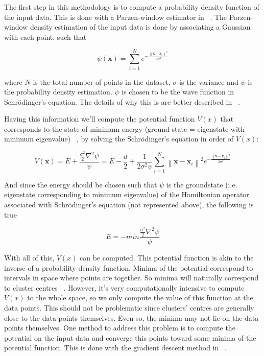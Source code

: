 The first step in this methodology is to compute a probability density function of the input data. This is done with a Parzen-window estimator in ~\cite{Horn2001a,Weinstein2009}.
The Parzen-window density estimation of the input data is done by associating a Gaussian with each point, such that

$$ \psi (\mathbf{x}) = \sum ^N _{i=1} e^{- \frac{\left \| \mathbf{x}-\mathbf{x}_i \right \| ^2}{2 \sigma ^2}} $$

where $N$ is the total number of points in the dataset, $\sigma$ is the variance and $\psi$ is the probability density estimation. $\psi$ is chosen to be the wave function in Schrödinger's equation. The details of why this is are better described in ~\cite{Weinstein2009,Horn2001a,Horn2001b}.

Having this information we'll compute the potential function $V(x)$ that corresponds to the state of minimum energy (ground state = eigenstate with minimum eigenvalue) ~\cite{Horn2001a}, by solving the Schrödinger's equation in order of $V(x)$:      

$$
V(\mathbf{x}) = E + \frac {\frac{\sigma^2}{2}\nabla^2 \psi }{\psi} 
= E - \frac{d}{2} + \frac {1}{2 \sigma^2 \psi} \sum ^N _{i=1} \left \| \mathbf{x}-\mathbf{x}_i \right \| ^2 e^{- \frac{\left \| \mathbf{x}-\mathbf{x}_i \right \| ^2}{2 \sigma ^2}}
$$

And since the energy should be chosen such that $\psi$ is the groundstate (i.e. eigenstate corresponding to minimum eigenvalue) of the Hamiltonian operator associated with Schrödinger's equation (not represented above), the following is true

$$
E = - min \frac {\frac{\sigma^2}{2}\nabla^2 \psi }{\psi}
$$

With all of this, $V(x)$ can be computed.
This potential function is akin to the inverse of a probability density function. Minima of the potential correspond to intervals in space where points are together. So minima will naturally correspond to cluster centres ~\cite{Horn2001a}.
However, it's very computationally intensive to compute $V(x)$ to the whole space, so we only compute the value of this function at the data points.
This should not be problematic since clusters' centres are generally close to the data points themselves. 
Even so, the minima may not lie on the data points themselves.
One method to address this problem is to compute the potential on the input data and converge this points toward some minima of the potential function. This is done with the gradient descent method in ~\cite{Horn2001a}. 


